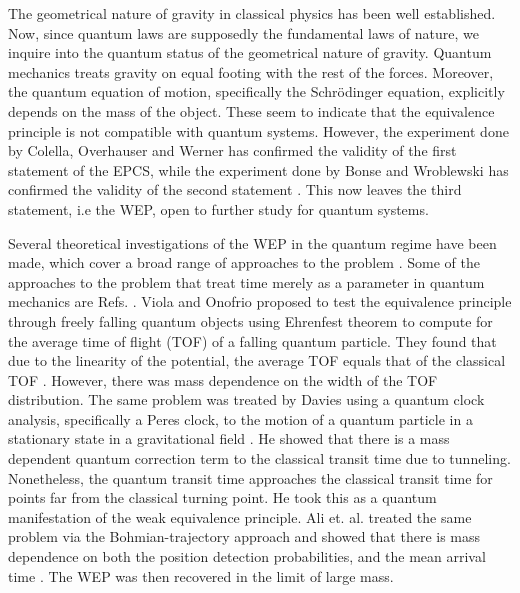 \documentclass[%
 reprint,
 amsmath,amssymb,
 aps,
]{revtex4-1}
\begin{document}
The geometrical nature of gravity in classical physics has been well established. Now, since quantum laws are supposedly the fundamental laws of nature, we inquire into the quantum status of the geometrical nature of gravity. Quantum mechanics treats gravity on equal footing with the rest of the forces. Moreover, the quantum equation of motion, specifically the Schr\"{o}dinger equation, explicitly depends on the mass of the object. These seem to indicate that the equivalence principle is not compatible with quantum systems. However, the experiment done by Colella, Overhauser and Werner has confirmed the validity of the first statement of the EPCS, while the experiment done by Bonse and Wroblewski has confirmed the validity of the second statement \cite{cow_wrob1,cow_wrob2}. This now leaves the third statement, i.e the WEP, open to further study for quantum systems. 

Several theoretical investigations of the WEP in the quantum regime have been made, which cover a broad range of approaches to the problem \cite{daviesfang,candelassciama,alvarezmann,dalvit,singleton,greenberger,zych_brukner,orlando,mousavi2015,chowdhury2012,viola1997,davies2004a,ali2006,statement}. Some of the approaches to the problem that treat time merely as a parameter in quantum mechanics are Refs. \cite{viola1997,davies2004a,ali2006}. Viola and Onofrio proposed to test the equivalence principle through freely falling quantum objects using Ehrenfest theorem to compute for the average time of flight (TOF) of a falling quantum particle. They found that due to the linearity of the potential, the average TOF equals that of the classical TOF \cite{viola1997}. However, there was mass dependence on the width of the TOF distribution. The same problem was treated by Davies using a quantum clock analysis, specifically a Peres clock, to the motion of a quantum particle in a stationary state in a gravitational field \cite{davies2004a}. He showed that there is a mass dependent quantum correction term to the classical transit time due to tunneling. Nonetheless, the quantum transit time approaches the classical transit time for points far from the classical turning point. He took this as a quantum manifestation of the weak equivalence principle. Ali et. al. treated the same problem via the Bohmian-trajectory approach and showed that there is mass dependence on both the position detection probabilities, and the mean arrival time \cite{ali2006}. The WEP was then recovered in the limit of large mass. 
\end{document}
